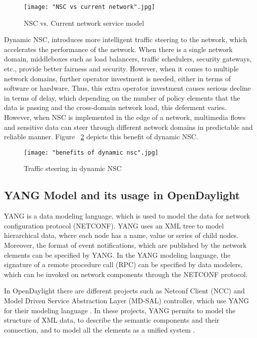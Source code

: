 \begin{figure}[h!]
\centering
{}
\texttt{[image: "NSC vs current network".jpg]}
\caption{NSC vs. Current network service model \cite{Wol13}}
\label{fig:NSC}
\end{figure}

Dynamic NSC, introduces more intelligent traffic steering to the network, which accelerates the performance of the network. When there is a single network domain, middleboxes such as load balancers, traffic schedulers, security gateways, etc., provide better fairness and security. However, when it comes to multiple network domains, further operator investment is needed, either in terms of software or hardware. Thus, this extra operator investment causes serious decline in terms of delay, which depending on the number of policy elements that the data is passing and the cross-domain network load, this deferment varies. However, when NSC is implemented in the edge of a network, multimedia flows and sensitive data can steer through different network domains in predictable and reliable manner. Figure ~\ref{fig:NSCbenefit} depicts this benefit of dynamic NSC. 


\begin{figure}[h!]
\centering
{}
\texttt{[image: "benefits of dynamic nsc".jpg]}
\caption{Traffic steering in dynamic NSC \cite{Wol13}}
\label{fig:NSCbenefit}
\end{figure}

\subsection{YANG Model and its usage in OpenDaylight}

YANG is a data modeling language, which is used to model the data for network configuration protocol (NETCONF). YANG uses an XML tree to model hierarchical data, where each node has a name, value or series of child nodes. Moreover, the format of event notifications, which are published by the network elements can be specified by YANG. In the YANG modeling language, the signature of a remote procedure call (RPC) can be specified by data modelers, which can be invoked on network components through the NETCONF protocol. \cite{Bjo10}

In OpenDaylight there are different projects such as Netconf Client (NCC) and Model Driven Service Abstraction Layer (MD-SAL) controller, which use YANG for their modeling language \cite{MDS} \cite{Netconf}. In these projects, YANG permits to model the structure of XML data, to describe the semantic components and their connection, and to model all the elements as a unified system \cite{MDS}.

